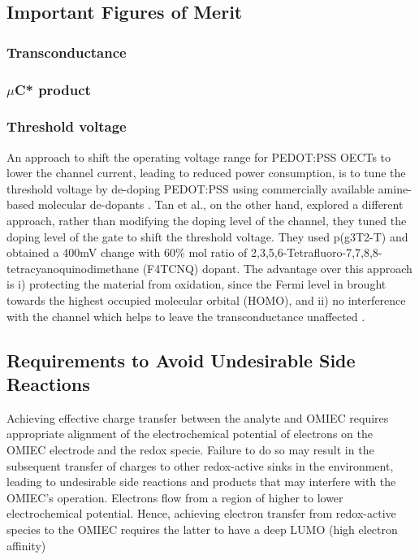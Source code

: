 \subsection{Important Figures of Merit}

\subsubsection{Transconductance}

\subsubsection{$\mu$C* product}

\subsubsection{Threshold voltage}

An approach to shift the operating voltage range for PEDOT:PSS OECTs to lower the channel current, leading to reduced power consumption, is to tune the threshold voltage by de-doping PEDOT:PSS using commercially available amine-based molecular de-dopants \cite{keeneEnhancementModePEDOTPSS2020}. Tan et al., on the other hand, explored a different approach, rather than modifying the doping level of the channel, they tuned the doping level of the gate to shift the threshold voltage. They used p(g3T2-T) and obtained a 400mV change with 60\% mol ratio of 2,3,5,6-Tetrafluoro-7,7,8,8-tetracyanoquinodimethane (F4TCNQ) dopant. The advantage over this approach is i) protecting the material from oxidation, since the Fermi level in brought towards the highest occupied molecular orbital (HOMO), and ii) no interference with the channel which helps to leave the transconductance unaffected \cite{tanTuningOrganicElectrochemical2022}.

{\subsection{Requirements to Avoid Undesirable Side Reactions}}
\label{subsec:req}

Achieving effective charge transfer between the analyte and OMIEC requires appropriate alignment of the electrochemical potential of electrons on the OMIEC electrode and the redox specie. Failure to do so may result in the subsequent transfer of charges to other redox-active sinks in the environment, leading to undesirable side reactions and products that may interfere with the OMIEC’s operation. Electrons flow from a region of higher to lower electrochemical potential. Hence, achieving electron transfer from redox-active species to the OMIEC requires the latter to have a deep LUMO (high electron affinity) \cite{tanMixedIonicElectronic2022} %


